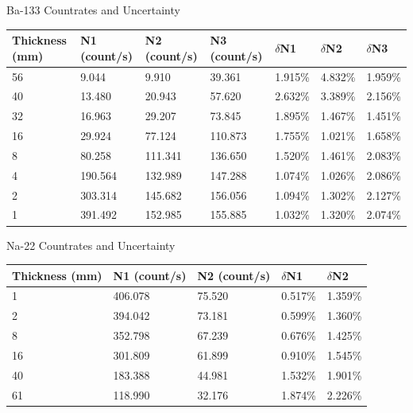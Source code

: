 \documentclass{article}
\begin{document}
		\begin{center}
		Ba-133 Countrates and Uncertainty\\
		\begin{tabular}{|l|l|l|l|l|l|l|}
			\hline
			Thickness (mm) & N1 (count/s) & N2 (count/s) & N3 (count/s) & $\delta$N1 & $\delta$N2 & $\delta$N3\\ \hline \hline
			56 & 9.044 & 9.910 & 39.361 & 1.915\% & 4.832\% & 1.959\%\\ \hline
			40 & 13.480 & 20.943 & 57.620 & 2.632\% & 3.389\% & 2.156\%\\ \hline
			32 & 16.963 & 29.207 & 73.845 & 1.895\% & 1.467\% & 1.451\%\\ \hline
			16 & 29.924 & 77.124 & 110.873 & 1.755\% & 1.021\% & 1.658\%\\ \hline
			8 & 80.258 & 111.341 & 136.650 & 1.520\% & 1.461\% & 2.083\%\\ \hline
			4 & 190.564 & 132.989 & 147.288 & 1.074\% & 1.026\% & 2.086\%\\ \hline
			2 & 303.314 & 145.682 & 156.056 & 1.094\% & 1.302\% & 2.127\%\\ \hline
			1 & 391.492 & 152.985 & 155.885 & 1.032\% & 1.320\% & 2.074\%\\
			\hline
		\end{tabular}
		\end{center}

		\begin{center}
		Na-22 Countrates and Uncertainty\\
		\begin{tabular}{|l|l|l|l|l|}
			\hline
			Thickness (mm) & N1 (count/s) & N2 (count/s) & $\delta$N1 & $\delta$N2\\ \hline \hline
			1 & 406.078 & 75.520 & 0.517\% & 1.359\%\\ \hline
			2 & 394.042 & 73.181 & 0.599\% & 1.360\%\\ \hline
			8 & 352.798 & 67.239 & 0.676\% & 1.425\%\\ \hline
			16 & 301.809 & 61.899 & 0.910\% & 1.545\%\\ \hline
			40 & 183.388 & 44.981 & 1.532\% & 1.901\%\\ \hline
			61 & 118.990 & 32.176 & 1.874\% & 2.226\%\\
			\hline
		\end{tabular}
		\end{center}
\end{document}

